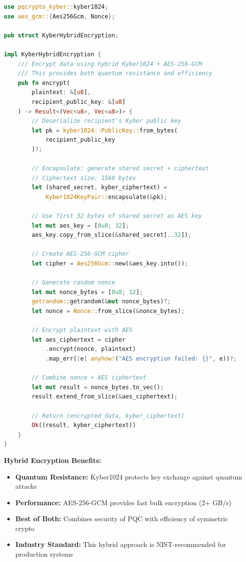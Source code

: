 \documentclass[11pt,a4paper]{article}
\begin{document}
\begin{lstlisting}[language=Rust,caption={Kyber1024 Hybrid Encryption - NIST Level 5 KEM}]
use pqcrypto_kyber::kyber1024;
use aes_gcm::{Aes256Gcm, Nonce};

pub struct KyberHybridEncryption;

impl KyberHybridEncryption {
    /// Encrypt data using hybrid Kyber1024 + AES-256-GCM
    /// This provides both quantum resistance and efficiency
    pub fn encrypt(
        plaintext: &[u8],
        recipient_public_key: &[u8]
    ) -> Result<(Vec<u8>, Vec<u8>)> {
        // Deserialize recipient's Kyber public key
        let pk = kyber1024::PublicKey::from_bytes(
            recipient_public_key
        )?;

        // Encapsulate: generate shared secret + ciphertext
        // Ciphertext size: 1568 bytes
        let (shared_secret, kyber_ciphertext) =
            Kyber1024KeyPair::encapsulate(&pk);

        // Use first 32 bytes of shared secret as AES key
        let mut aes_key = [0u8; 32];
        aes_key.copy_from_slice(&shared_secret[..32]);

        // Create AES-256-GCM cipher
        let cipher = Aes256Gcm::new(&aes_key.into());

        // Generate random nonce
        let mut nonce_bytes = [0u8; 12];
        getrandom::getrandom(&mut nonce_bytes)?;
        let nonce = Nonce::from_slice(&nonce_bytes);

        // Encrypt plaintext with AES
        let aes_ciphertext = cipher
            .encrypt(nonce, plaintext)
            .map_err(|e| anyhow!("AES encryption failed: {}", e))?;

        // Combine nonce + AES ciphertext
        let mut result = nonce_bytes.to_vec();
        result.extend_from_slice(&aes_ciphertext);

        // Return (encrypted_data, kyber_ciphertext)
        Ok((result, kyber_ciphertext))
    }
}
\end{lstlisting}

\textbf{Hybrid Encryption Benefits:}
\begin{itemize}[leftmargin=*]
\item \textbf{Quantum Resistance:} Kyber1024 protects key exchange against quantum attacks
\item \textbf{Performance:} AES-256-GCM provides fast bulk encryption (2+ GB/s)
\item \textbf{Best of Both:} Combines security of PQC with efficiency of symmetric crypto
\item \textbf{Industry Standard:} This hybrid approach is NIST-recommended for production systems
\end{itemize}
\end{document}
